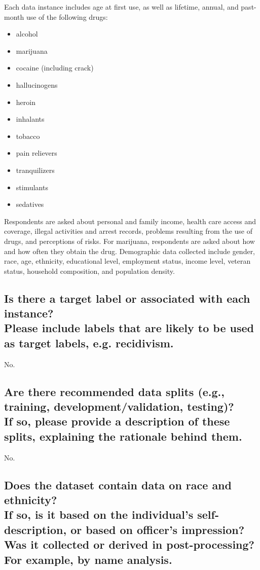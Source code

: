 \documentclass[letterpaper, 10 pt, conference]{ieeeconf}  %
\newcommand{\subtitle}[1]{{\\ \small \normalfont \color{purple} #1}}
\begin{document}
Each data instance includes age at first use, as well as lifetime, annual, and past-month use of the following drugs:

\begin{itemize}
    \item alcohol
    \item marijuana
    \item cocaine (including crack)
    \item hallucinogens
    \item heroin 
    \item inhalants 
    \item tobacco
    \item pain relievers
    \item tranquilizers
    \item stimulants
    \item sedatives
\end{itemize}

Respondents are asked about personal and family income, health care access and coverage, illegal activities and arrest records, problems resulting from the use of drugs, and perceptions of risks. For marijuana, respondents are asked about how and how often they obtain the drug. Demographic data collected include gender, race, age, ethnicity, educational level, employment status, income level, veteran status, household composition, and population density.

\subsection{Is there a target label or associated with each instance? \subtitle{Please include labels that are likely to be used as target labels, e.g. recidivism.}}

No.

\subsection{Are there recommended data splits (e.g., training, development/validation, testing)? \subtitle{If so, please provide a description of these splits, explaining the rationale behind them.}}

No.

\subsection{Does the dataset contain data on race and ethnicity? \subtitle{If so, is it based on the individual's self-description, or based on officer's impression? Was it collected or derived in post-processing? For example, by name analysis.}}
\end{document}
